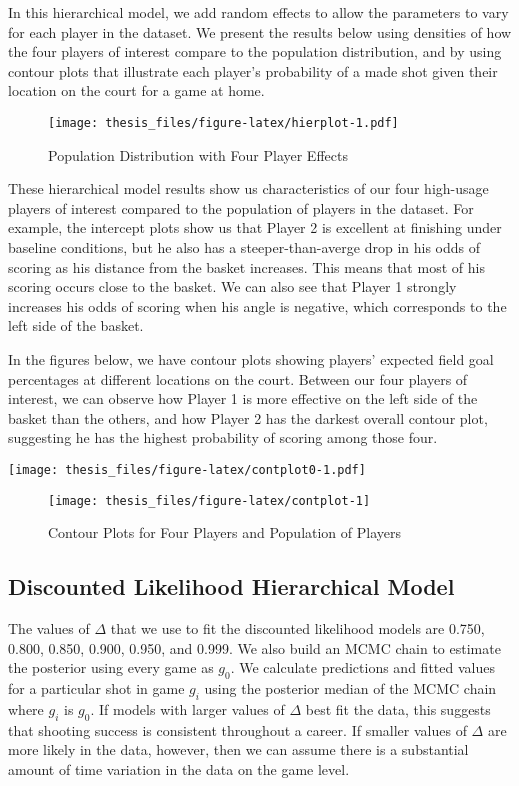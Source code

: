 \documentclass[12pt,twoside]{dukestatscithesis}
\theoremstyle{definition}
\theoremstyle{definition}
\theoremstyle{definition}
\theoremstyle{remark}
\begin{document}
In this hierarchical model, we add random effects to allow the
parameters to vary for each player in the dataset. We present the
results below using densities of how the four players of interest
compare to the population distribution, and by using contour plots that
illustrate each player's probability of a made shot given their location
on the court for a game at home.
\begin{figure}[htbp]
\centering
\texttt{[image: thesis\_files/figure-latex/hierplot-1.pdf]}
\caption{\label{fig:hierplot}Population Distribution with Four Player
Effects}
\end{figure}
These hierarchical model results show us characteristics of our four
high-usage players of interest compared to the population of players in
the dataset. For example, the intercept plots show us that Player 2 is
excellent at finishing under baseline conditions, but he also has a
steeper-than-averge drop in his odds of scoring as his distance from the
basket increases. This means that most of his scoring occurs close to
the basket. We can also see that Player 1 strongly increases his odds of
scoring when his angle is negative, which corresponds to the left side
of the basket.

In the figures below, we have contour plots showing players' expected
field goal percentages at different locations on the court. Between our
four players of interest, we can observe how Player 1 is more effective
on the left side of the basket than the others, and how Player 2 has the
darkest overall contour plot, suggesting he has the highest probability
of scoring among those four.

\texttt{[image: thesis\_files/figure-latex/contplot0-1.pdf]}
\begin{figure}

\hfill{}\texttt{[image: thesis\_files/figure-latex/contplot-1]} 

\caption{Contour Plots for Four Players and Population of Players}\label{fig:contplot}
\end{figure}
\subsection{Discounted Likelihood Hierarchical
Model}\label{discounted-likelihood-hierarchical-model-1}

The values of \(\Delta\) that we use to fit the discounted likelihood
models are 0.750, 0.800, 0.850, 0.900, 0.950, and 0.999. We also build
an MCMC chain to estimate the posterior using every game as \(g_0\). We
calculate predictions and fitted values for a particular shot in game
\(g_i\) using the posterior median of the MCMC chain where \(g_i\) is
\(g_0\). If models with larger values of \(\Delta\) best fit the data,
this suggests that shooting success is consistent throughout a career.
If smaller values of \(\Delta\) are more likely in the data, however,
then we can assume there is a substantial amount of time variation in
the data on the game level.
\end{document}
